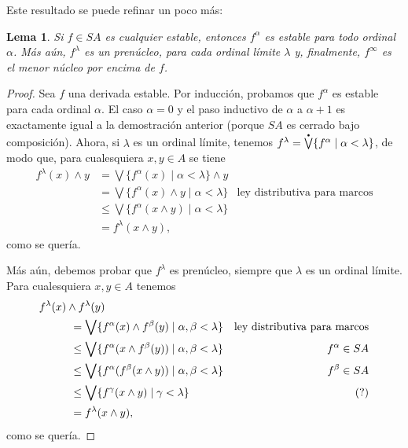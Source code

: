 \documentclass[12pt,letterpaper,titlepage]{article}
\newtheorem*{lemma}{Lema}
\theoremstyle{definition}
\newcommand\Sup{\bigvee}
\renewcommand\inf{\wedge}
\newcommand\pSup{%
    {\stackrel{\raisebox{-3pt}{\scalebox{0.5}{$\bullet$}}}{\bigvee}}
  }%
\newcommand\<{\langle}
\renewcommand\>{\rangle}
\begin{document}
Este resultado se puede refinar un poco más:
\begin{lemma}
  Si $f\in SA$ es cualquier estable, entonces $f^\alpha$ es
  estable para todo ordinal $\alpha$.
  Más aún, $f^\lambda$ es un prenúcleo, para cada ordinal límite
  $\lambda$ y, finalmente, $f^\infty$ es el menor núcleo por
  encima de $f$.
\end{lemma}
\begin{proof}
  Sea $f$ una derivada estable.
  Por inducción, probamos que $f^\alpha$ es estable para cada
  ordinal $\alpha$.
  El caso $\alpha=0$ y el paso inductivo de $\alpha$ a $\alpha+1$
  es exactamente igual a la demostración anterior (porque $SA$ es
  cerrado bajo composición).
  Ahora, si $\lambda$ es un ordinal límite, tenemos
  $f^\lambda = \pSup\{f^\alpha \mid \alpha < \lambda\}$, de modo
  que, para cualesquiera $x,y\in A$ se tiene
  \begin{align*}
    f^\lambda(x)\inf y
    &= \Sup\{f^\alpha(x) \mid \alpha <\lambda\} \inf y \\
    &= \Sup\{f^\alpha(x)\inf y\mid \alpha <\lambda\}
      & \text{ley distributiva para marcos} \\
    &\leq \Sup\{f^\alpha(x\inf y)\mid \alpha <\lambda\} \\
    &= f^\lambda(x\inf y),
  \end{align*}
  como se quería.

  Más aún, debemos probar que $f^\lambda$ es prenúcleo, siempre
  que $\lambda$ es un ordinal límite.
  Para cualesquiera $x,y\in A$ tenemos
  \begin{align*}
    &f^\lambda(x)\inf f^\lambda(y) \\
    &\hspace{10mm}
    = \Sup\{f^\alpha(x)\inf f^\beta(y) \mid \alpha,\beta <\lambda\}
      & \text{ley distributiva para marcos} \\
    &\hspace{10mm}
    \leq \Sup\{f^\alpha(x\inf f^\beta(y)) \mid \alpha,\beta <\lambda\}
      & f^\alpha \in SA \\
    &\hspace{10mm}
    \leq \Sup\{f^\alpha(f^\beta(x\inf y)) \mid \alpha,\beta <\lambda\}
      & f^\beta \in SA \\
    &\hspace{10mm}
    \leq \Sup\{f^\gamma(x\inf y) \mid \gamma<\lambda\}
      & (?) \\
    &\hspace{10mm}
    = f^\lambda(x\inf y),
  \end{align*}
  como se quería.
\end{proof}
\end{document}
